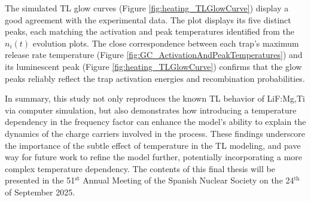 \vspace{10pt}

The simulated TL glow curves (Figure \ref{fig:heating_TLGlowCurve}) display a good agreement with the experimental data. The plot displays its five distinct peaks, each matching the activation and peak temperatures identified from the $n_i(t)$ evolution plots. The close correspondence between each trap's maximum release rate temperature (Figure \ref{fig:GC_ActivationAndPeakTemperatures}) and its luminescent peak (Figure \ref{fig:heating_TLGlowCurve}) confirms that the glow peaks reliably reflect the trap activation energies and recombination probabilities.

\vspace{10pt}

In summary, this study not only reproduces the known TL behavior of LiF:Mg,Ti via computer simulation, but also demonstrates how introducing a temperature dependency in the frequency factor can enhance the model's ability to explain the dynamics of the charge carriers involved in the process. These findings underscore the importance of the subtle effect of temperature in the TL modeling, and pave way for future work to refine the model further, potentially incorporating a more complex temperature dependency. The contents of this final thesis will be presented in the 51$^{\text{st}}$ Annual Meeting of the Spanish Nuclear Society on the 24$^{\text{th}}$ of September 2025.